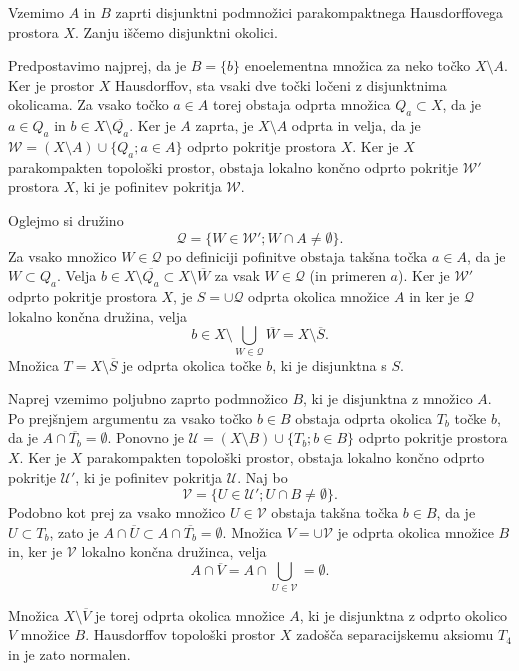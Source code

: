 \documentclass[mat1]{fmfdelo}
\newcommand{\Ucurl}{\mathcal{U}}
\newcommand{\closure}[1]{\overline{#1}}
\begin{document}
\begin{dokaz}
Vzemimo $A$ in $B$ zaprti disjunktni podmnožici parakompaktnega Hausdorffovega prostora $X$. Zanju iščemo disjunktni okolici.

Predpostavimo najprej, da je $B = \lbrace b \rbrace$ enoelementna množica za neko točko $X\setminus A$. Ker je prostor $X$ Hausdorffov, sta vsaki dve točki ločeni z disjunktnima okolicama. Za vsako točko $a \in A$ torej obstaja odprta množica $Q_a \subset X$, da je $a \in Q_a$ in $b \in X \setminus \closure{Q_a}$. Ker je $A$ zaprta, je $X \setminus A$ odprta in velja, da je $\mathcal{W} = (X \setminus A)\cup \lbrace Q_a ; a \in A \rbrace$ odprto pokritje prostora $X$. Ker je $X$ parakompakten topološki prostor, obstaja lokalno končno odprto pokritje $\mathcal{W}'$ prostora $X$, ki je pofinitev pokritja $\mathcal{W}$.

Oglejmo si družino \[ \mathcal{Q} = \lbrace W \in \mathcal{W}' ; W \cap A \neq \emptyset \rbrace. \]
Za vsako množico $W \in \mathcal{Q}$ po definiciji pofinitve obstaja takšna točka $a \in A$, da je $W \subset Q_a$. Velja $b \in X \setminus \closure{Q_a} \subset X \setminus \closure{W}$ za vsak $W \in \mathcal{Q}$ (in primeren $a$). Ker je $\mathcal{W}'$ odprto pokritje prostora $X$, je $S = \cup\mathcal{Q}$ odprta okolica množice $A$ in ker je $\mathcal{Q}$ lokalno končna družina, velja \[ b \in X \setminus \bigcup_{W \in \mathcal{Q}} \closure{W} = X \setminus \closure{S}. \] Množica $T = X \setminus \closure{S}$ je odprta okolica točke $b$, ki je disjunktna s $S$.

Naprej vzemimo poljubno zaprto podmnožico $B$, ki je disjunktna z množico $A$. Po prejšnjem argumentu za vsako točko $b \in B$ obstaja odprta okolica $T_b$ točke $b$, da je $A \cap \closure{T_b} = \emptyset$. Ponovno je $\Ucurl = (X\setminus B) \cup \lbrace T_b ; b \in B \rbrace$ odprto pokritje prostora $X$. Ker je $X$ parakompakten topološki prostor, obstaja lokalno končno odprto pokritje $\Ucurl'$, ki je pofinitev pokritja $\Ucurl$. Naj bo \[ \mathcal{V} = \lbrace U \in \Ucurl' ; U \cap B \neq \emptyset \rbrace. \]
Podobno kot prej za vsako množico $U \in \mathcal{V}$ obstaja takšna točka $b \in B$, da je $U \subset T_b$, zato je $A \cap \closure{U} \subset A \cap \closure{T_b} = \emptyset$. Množica $V = \cup \mathcal{V}$ je odprta okolica množice $B$ in, ker je $\mathcal{V}$ lokalno končna družinca, velja \[ A \cap \closure{V} = A \cap \bigcup_{U \in \mathcal{V}} = \emptyset.\]

Množica $X \setminus \closure{V}$ je torej odprta okolica množice $A$, ki je disjunktna z odprto okolico $V$ množice $B$. Hausdorffov topološki prostor $X$ zadošča separacijskemu aksiomu $T_4$ in je zato normalen.
\end{dokaz}
\end{document}
